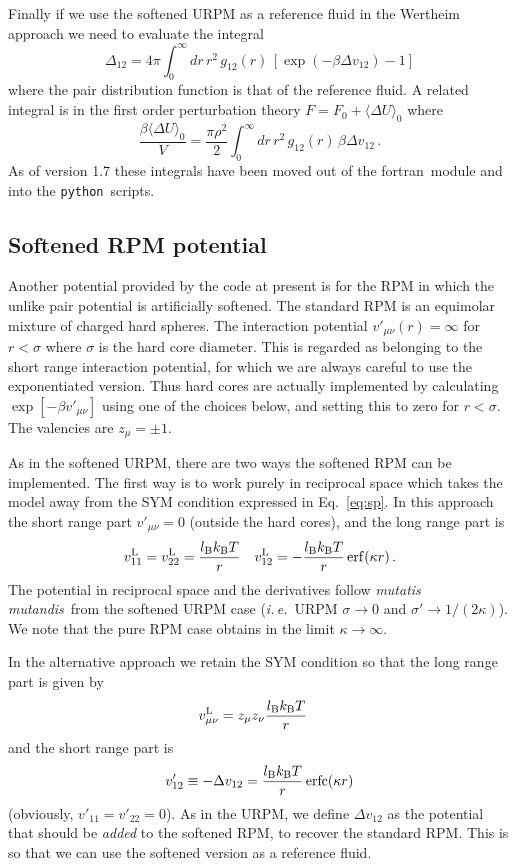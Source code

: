 \documentclass[12pt,a4paper]{article}
\DeclareMathOperator{\erf}{erf}
\DeclareMathOperator{\erfc}{erfc}
\newcommand{\latin}[1]{\emph{#1}}
\newcommand{\ie}{\latin{i.\,e.}}
\newcommand{\mutmut}{\latin{mutatis mutandis}}
\newcommand{\kB}{k_{\mathrm{B}}}
\newcommand{\kT}{\kB T}
\newcommand{\lr}{^{\mathrm{L}}}
\newcommand{\Eqref}[1]{Eq.~\eqref{#1}}
\newcommand{\myav}[1]{\langle #1\rangle}
\newcommand{\FORTRAN}{{\sc fortran}}
\newcommand{\python}{{\tt python}}
\begin{document}
Finally if we use the softened URPM as a reference fluid in the Wertheim
approach we need to evaluate the integral
%
\begin{equation}
\Delta_{12}={4\pi}\int_0^\infty\!\!dr\,r^2\,g_{12}(r)\,
[\exp(-\beta \Delta v_{12})-1]
\label{eq:wert}
\end{equation}
%
where the pair distribution function is that of the reference fluid.
A related integral is in the first order perturbation theory
$F=F_0+\myav{\Delta U}_0$ where
%
\begin{equation}
\frac{\beta\myav{\Delta U}_0}{V}=
\frac{\pi\rho^2}{2}
\int_0^\infty\!\!dr\,r^2\,g_{12}(r)\,
\beta \Delta v_{12}\,.
\label{eq:fopt}
\end{equation}
%
As of version 1.7 these integrals have been moved out of the
\FORTRAN\ module and into the \python{}ripts.

\subsection{Softened RPM potential}
\label{sec:softRPM}
%
Another potential provided by the code at present is for the RPM in
which the unlike pair potential is artificially softened.  The
standard RPM is an equimolar mixture of charged hard spheres.  The
interaction potential $v'_{\mu\nu}(r)=\infty$ for $r<\sigma$ where
$\sigma$ is the hard core diameter.  This is regarded as belonging to
the short range interaction potential, for which we are always careful
to use the exponentiated version.  Thus hard cores are actually
implemented by calculating $\exp[-\beta v'_{\mu\nu}]$ using one of the
choices below, and setting this to zero for $r<\sigma$.  The valencies are
$z_\mu=\pm1$.

As in the softened URPM, there are two ways the softened RPM can be
implemented.  The first way is to work purely in reciprocal space
which takes the model away from the SYM condition expressed in
\Eqref{eq:sp}.  In this approach the short range part $v'_{\mu\nu}=0$
(outside the hard cores), and the long range part is
%
\begin{equation}
v_{11}\lr=v_{22}\lr=\frac{\lB\kT}{r}\quad
v_{12}\lr=-\frac{\lB\kT}{r} \erf(\kappa r)\,.
\end{equation}
%
The potential in reciprocal space and the derivatives follow
\mutmut\ from the softened URPM case (\ie\ URPM $\sigma\to0$ and
$\sigma'\to1/(2\kappa)$).  We note that the pure RPM case obtains in
the limit $\kappa\to\infty$.
  
In the alternative approach we retain the SYM condition so that the
long range part is given by
%
\begin{equation}
v_{\mu\nu}\lr=z_\mu z_\nu \frac{\lB\kT}{r}\quad
\end{equation}
%
and the short range part is
%
\begin{equation}
v'_{12}\equiv-\Delta v_{12}=\frac{\lB\kT}{r}\erfc(\kappa r)
\label{eq:dv12a}
\end{equation}
%
(obviously, $v'_{11}=v'_{22}=0$).  As in the URPM, we define $\Delta
v_{12}$ as the potential that should be \emph{added} to the softened
RPM, to recover the standard RPM.  This is so that we can use the
softened version as a reference fluid.
\end{document}
